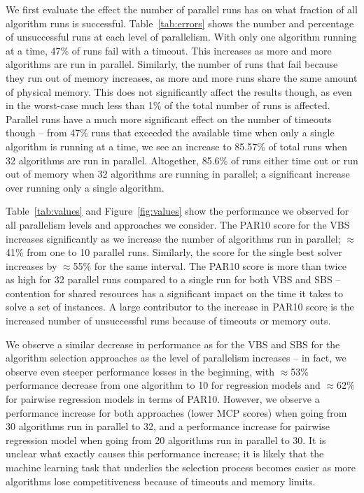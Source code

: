 We first evaluate the effect the number of parallel runs has on what fraction of all algorithm runs is successful. Table~\ref{tab:errors} shows the number and percentage of unsuccessful runs at each level of parallelism. With only one algorithm running at a time, 47\% of runs fail with a timeout. This increases as more and more algorithms are run in parallel. Similarly, the number of runs that fail because they run out of memory increases, as more and more runs share the same amount of physical memory. This does not significantly affect the results though, as even in the worst-case much less than 1\% of the total number of runs
is affected. Parallel runs have a much more significant effect on the number of timeouts though -- from 47\% runs that exceeded the available time when only a single algorithm is running at a time, we see an increase to 85.57\% of total runs when 32 algorithms are run in parallel. Altogether, 85.6\% of runs either time out or run out of memory when 32 algorithms are running in parallel; a significant increase over running only a single algorithm.

Table~\ref{tab:values} and Figure~\ref{fig:values} show the performance we
observed for all parallelism levels and approaches we consider. The PAR10 score
for the VBS increases significantly as we increase the number of algorithms run
in parallel; $\approx$41\% from one to 10 parallel runs. Similarly, the score
for the single best solver increases by $\approx$55\% for the same interval. The
PAR10 score is more than twice as high for 32 parallel runs compared to a single
run for both VBS and SBS -- contention for shared resources has a significant
impact on the time it takes to solve a set of instances. A large contributor to
the increase in PAR10 score is the increased number of unsuccessful runs because
of timeouts or memory outs.

We observe a similar decrease in performance as for the VBS and SBS for the algorithm selection approaches as the level of parallelism increases -- in fact, we observe even steeper performance losses in the beginning, with $\approx$53\% performance decrease from one algorithm to 10 for regression models and $\approx$62\% for pairwise regression models in terms of PAR10. However, we observe a performance increase for both approaches (lower MCP scores) when going from 30 algorithms run in parallel to 32, and a performance increase for pairwise regression model when going from 20 algorithms run in parallel to 30. It is unclear what exactly causes this performance increase; it is likely that the machine learning task that underlies the selection process becomes easier as more algorithms lose competitiveness because of timeouts and memory limits.


